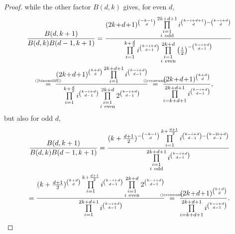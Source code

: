 \begin{proof}
while the other factor $B(d,k)$ gives, for even $d$,
\begin{gather*}
\frac{B(d,k+1)}{B(d,k)B(d-1,k+1)} = \frac{ (2k\!+\!d\!+\!1)^{\binom{-k-1}{d}} \prod\limits_{\substack{i=1 \\ i\ \text{odd} }}^{2k+d+1}i^{\binom{k-i+d+1}{d}-\binom{k-i+d}{d}}  }{\prod\limits_{i=1}^{k+\frac{d}{2}} i^{\binom{k-i+d}{d-1}} \prod\limits_{\substack{i=1 \\ i\ \text{even} }}^{2k+d} \left(\frac{i}{2}\right)^{- \binom{k-i+d}{d-1}} } \\
\myeq{(\ref{binomdiff})}\ \frac{ (2k\!+\!d\!+\!1)^{\binom{k+d}{d}}  \prod\limits_{i=1}^{2k+d+1}i^{\binom{k-i+d}{d-1}}  }{ \prod\limits_{i=1}^{k+\frac{d}{2}} i^{\binom{k-i+d}{d-1}} \prod\limits_{\substack{i=1 \\ i\ \text{even} }}^{2k+d} 2^{ \binom{k-i+d}{d-1}} } 
\ \myeq{(\ref{evensum})} \ \frac{ (2k\!+\!d\!+\!1)^{\binom{k+d}{d}} }{ \prod\limits_{i=k+d+1}^{2k+d+1}i^{ \binom{k-i+d}{d-1}} },
\end{gather*}
but also for odd $d$,
\begin{gather*}
\frac{B(d,k+1)}{B(d,k)B(d-1,k+1)} = \frac{ (k+\tfrac{d+1}{2})^{-\binom{-k-1}{d}} \prod\limits_{i=1}^{k+\frac{d+1}{2}} i^{\binom{k-i+d}{d-1}-\binom{k-2i+d}{d-1}}  }{ \prod\limits_{\substack{i=1 \\ i\ \text{odd} }}^{2k+d+1}i^{\binom{k-i+d}{d-1}} } \\
= \frac{ (k+\tfrac{d+1}{2})^{\binom{k+d}{d}} \prod\limits_{i=1}^{k+\frac{d+1}{2}} i^{\binom{k-i+d}{d-1}}  \prod\limits_{\substack{i=1 \\ i\ \text{even} }}^{2k+d} 2^{ \binom{k-i+d}{d-1}}}{ \prod\limits_{i=1}^{2k+d+1}i^{\binom{k-i+d}{d-1}}} 
\ \myeq{(\ref{evensum})} \ \frac{ (2k\!+\!d\!+\!1)^{\binom{k+d}{d}} }{ \prod\limits_{i=k+d+1}^{2k+d+1}i^{ \binom{k-i+d}{d-1}} }. \qedhere
\end{gather*}\nobreak
\end{proof}



